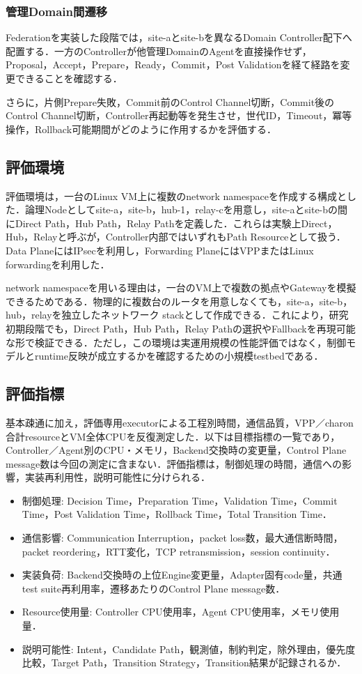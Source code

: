 \documentclass[11pt,a4paper,twoside]{ltjsarticle}
\begin{document}
\subsubsection{管理Domain間遷移}

Federationを実装した段階では，site-aとsite-bを異なるDomain Controller配下へ配置する．一方のControllerが他管理DomainのAgentを直接操作せず，Proposal，Accept，Prepare，Ready，Commit，Post Validationを経て経路を変更できることを確認する．

さらに，片側Prepare失敗，Commit前のControl Channel切断，Commit後のControl Channel切断，Controller再起動等を発生させ，世代ID，Timeout，冪等操作，Rollback可能期間がどのように作用するかを評価する．


\subsection{評価環境}
評価環境は，一台のLinux VM上に複数のnetwork namespaceを作成する構成とした．論理Nodeとしてsite-a，site-b，hub-1，relay-cを用意し，site-aとsite-bの間にDirect Path，Hub Path，Relay Pathを定義した．これらは実験上Direct，Hub，Relayと呼ぶが，Controller内部ではいずれもPath Resourceとして扱う．Data PlaneにはIPsecを利用し，Forwarding PlaneにはVPPまたはLinux forwardingを利用した．

network namespaceを用いる理由は，一台のVM上で複数の拠点やGatewayを模擬できるためである．物理的に複数台のルータを用意しなくても，site-a，site-b，hub，relayを独立したネットワーク stackとして作成できる．これにより，研究初期段階でも，Direct Path，Hub Path，Relay Pathの選択やFallbackを再現可能な形で検証できる．ただし，この環境は実運用規模の性能評価ではなく，制御モデルとruntime反映が成立するかを確認するための小規模testbedである．

\subsection{評価指標}
基本疎通に加え，評価専用executorによる工程別時間，通信品質，VPP／charon合計resourceとVM全体CPUを反復測定した．以下は目標指標の一覧であり，Controller／Agent別のCPU・メモリ，Backend交換時の変更量，Control Plane message数は今回の測定に含まない．評価指標は，制御処理の時間，通信への影響，実装再利用性，説明可能性に分けられる．

\begin{itemize}[leftmargin=*]
\item 制御処理: Decision Time，Preparation Time，Validation Time，Commit Time，Post Validation Time，Rollback Time，Total Transition Time．
\item 通信影響: Communication Interruption，packet loss数，最大通信断時間，packet reordering，RTT変化，TCP retransmission，session continuity．
\item 実装負荷: Backend交換時の上位Engine変更量，Adapter固有code量，共通test suite再利用率，遷移あたりのControl Plane message数．
\item Resource使用量: Controller CPU使用率，Agent CPU使用率，メモリ使用量．
\item 説明可能性: Intent，Candidate Path，観測値，制約判定，除外理由，優先度比較，Target Path，Transition Strategy，Transition結果が記録されるか．
\end{itemize}
\end{document}

